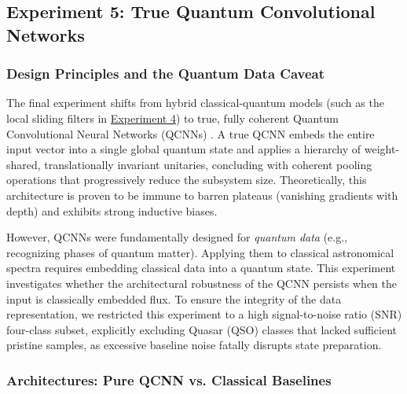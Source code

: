 
\subsection{Experiment 5: True Quantum Convolutional Networks}
\label{sec:exp5_methods}

\subsubsection{Design Principles and the Quantum Data Caveat}
\label{sec:exp5_philosophy}

The final experiment shifts from hybrid classical-quantum models (such as the local sliding filters in \hyperref[sec:exp4_methods]{Experiment 4}) to true, fully coherent Quantum Convolutional Neural Networks (QCNNs) \cite{cong2019qcnn}. A true QCNN embeds the entire input vector into a single global quantum state and applies a hierarchy of weight-shared, translationally invariant unitaries, concluding with coherent pooling operations that progressively reduce the subsystem size. Theoretically, this architecture is proven to be immune to barren plateaus (vanishing gradients with depth) \cite{pesah2021absence} and exhibits strong inductive biases.

However, QCNNs were fundamentally designed for \textit{quantum data} (e.g., recognizing phases of quantum matter). Applying them to classical astronomical spectra requires embedding classical data into a quantum state. This experiment investigates whether the architectural robustness of the QCNN persists when the input is classically embedded flux. To ensure the integrity of the data representation, we restricted this experiment to a high signal-to-noise ratio (SNR) four-class subset, explicitly excluding Quasar (QSO) classes that lacked sufficient pristine samples, as excessive baseline noise fatally disrupts state preparation.

\subsubsection{Architectures: Pure QCNN vs. Classical Baselines}
\label{sec:exp5_arch}

